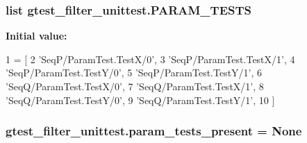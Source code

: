 \subsubsection[{\texorpdfstring{P\+A\+R\+A\+M\+\_\+\+T\+E\+S\+TS}{PARAM_TESTS}}]{\setlength{\rightskip}{0pt plus 5cm}list gtest\+\_\+filter\+\_\+unittest.\+P\+A\+R\+A\+M\+\_\+\+T\+E\+S\+TS}\hypertarget{namespacegtest__filter__unittest_a4c414863f1e2e9ac993ce4afda33f6b9}{}\label{namespacegtest__filter__unittest_a4c414863f1e2e9ac993ce4afda33f6b9}
{\bfseries Initial value\+:}
\begin{DoxyCode}
1 = [
2     \textcolor{stringliteral}{'SeqP/ParamTest.TestX/0'},
3     \textcolor{stringliteral}{'SeqP/ParamTest.TestX/1'},
4     \textcolor{stringliteral}{'SeqP/ParamTest.TestY/0'},
5     \textcolor{stringliteral}{'SeqP/ParamTest.TestY/1'},
6     \textcolor{stringliteral}{'SeqQ/ParamTest.TestX/0'},
7     \textcolor{stringliteral}{'SeqQ/ParamTest.TestX/1'},
8     \textcolor{stringliteral}{'SeqQ/ParamTest.TestY/0'},
9     \textcolor{stringliteral}{'SeqQ/ParamTest.TestY/1'},
10     ]
\end{DoxyCode}
\subsubsection[{\texorpdfstring{param\+\_\+tests\+\_\+present}{param_tests_present}}]{\setlength{\rightskip}{0pt plus 5cm}gtest\+\_\+filter\+\_\+unittest.\+param\+\_\+tests\+\_\+present = None}\hypertarget{namespacegtest__filter__unittest_aab31f58fd88fa64c14e6ab5dc5fb8da3}{}\label{namespacegtest__filter__unittest_aab31f58fd88fa64c14e6ab5dc5fb8da3}
